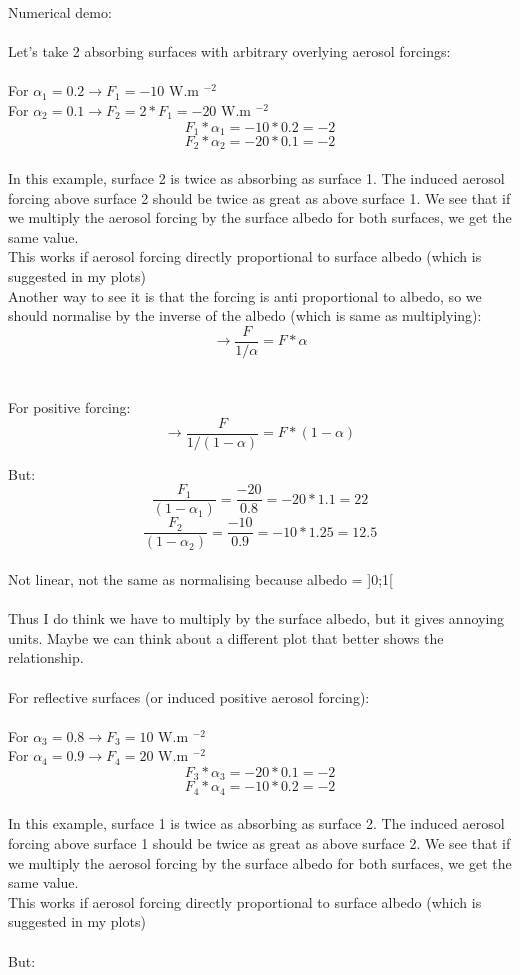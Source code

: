 \documentclass{article}
\begin{document}
Numerical demo:
\\\\
Let's take 2 absorbing surfaces with arbitrary overlying aerosol forcings:
\\\\
For $\alpha_1 = 0.2 \rightarrow F_1 = -10$ W.m $^{-2}$ 
\\
For $\alpha_2 = 0.1 \rightarrow F_2 = 2*F_1 = -20$ W.m $^{-2}$
\\
$$F_1*\alpha_1 = -10*0.2 = -2$$
$$F_2*\alpha_2 = -20*0.1 = -2$$
\\
In this example, surface 2 is twice as absorbing as surface 1. The induced aerosol forcing above surface 2 should be twice as great as above surface 1. We see that if we multiply the aerosol forcing by the surface albedo for both surfaces, we get the same value.
\\ 
This works if aerosol forcing directly proportional to surface albedo (which is suggested in my plots)
\\
Another way to see it is that the forcing is anti proportional to albedo, so we should normalise by the inverse of the albedo (which is same as multiplying):
$$\rightarrow \frac{F}{1/\alpha} = F*\alpha$$
\\\\
For positive forcing:
$$\rightarrow \frac{F}{1/(1-\alpha)} = F*(1-\alpha)$$

But:
\\
$$\frac{F_1}{(1 - \alpha_1)} = \frac{-20}{0.8} = -20*1.1 = 22$$
$$\frac{F_2}{(1 - \alpha_2)} = \frac{-10}{0.9} = -10*1.25 = 12.5$$
\\
Not linear, not the same as normalising because albedo = ]0;1[
\\\\
Thus I do think we have to multiply by the surface albedo, but it gives annoying units. Maybe we can think about a different plot that better shows the relationship. \\\\
For reflective surfaces (or induced positive aerosol forcing):
\\\\
For $\alpha_3 = 0.8 \rightarrow F_3 = 10$ W.m $^{-2}$ 
\\
For $\alpha_4 = 0.9 \rightarrow F_4 = 20$ W.m $^{-2}$
\\
$$F_3*\alpha_3 = -20*0.1 = -2$$
$$F_4*\alpha_4 = -10*0.2 = -2$$
\\
In this example, surface 1 is twice as absorbing as surface 2. The induced aerosol forcing above surface 1 should be twice as great as above surface 2. We see that if we multiply the aerosol forcing by the surface albedo for both surfaces, we get the same value.
\\ 
This works if aerosol forcing directly proportional to surface albedo (which is suggested in my plots)
\\\\
But:
\\
\end{document}
